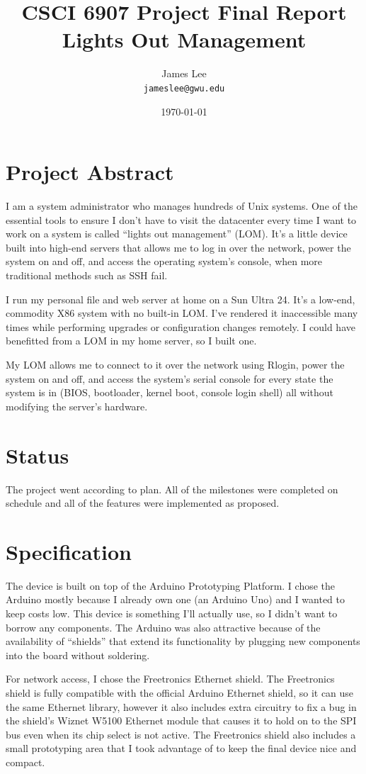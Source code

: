 \documentclass{amsart}
\title{CSCI 6907 Project Final Report\\
Lights Out Management}
\author{James Lee\\
\texttt{jameslee@gwu.edu}}
\date{\today}
\begin{document}
\maketitle

\section{Project Abstract}
I am a system administrator who manages hundreds of Unix systems.  One of the essential tools to ensure I don't have to visit the datacenter every time I want to work on a system is called ``lights out management'' (LOM).  It's a little device built into high-end servers that allows me to log in over the network, power the system on and off, and access the operating system's console, when more traditional methods such as SSH fail.

I run my personal file and web server at home on a Sun Ultra 24.  It's a low-end, commodity X86 system with no built-in LOM.  I've rendered it inaccessible many times while performing upgrades or configuration changes remotely.  I could have benefitted from a LOM in my home server, so I built one.

My LOM allows me to connect to it over the network using Rlogin, power the system on and off, and access the system's serial console for every state the system is in (BIOS, bootloader, kernel boot, console login shell) all without modifying the server's hardware.

\section{Status}
The project went according to plan.  All of the milestones were completed on schedule and all of the features were implemented as proposed.

\section{Specification}
The device is built on top of the Arduino Prototyping Platform.  I chose the Arduino mostly because I already own one (an Arduino Uno) and I wanted to keep costs low.  This device is something I'll actually use, so I didn't want to borrow any components.  The Arduino was also attractive because of the availability of ``shields'' that extend its functionality by plugging new components into the board without soldering.

For network access, I chose the Freetronics Ethernet shield.  The Freetronics shield is fully compatible with the official Arduino Ethernet shield, so it can use the same Ethernet library, however it also includes extra circuitry to fix a bug in the shield's Wiznet W5100 Ethernet module that causes it to hold on to the SPI bus even when its chip select is not active.  The Freetronics shield also includes a small prototyping area that I took advantage of to keep the final device nice and compact.
\end{document}
